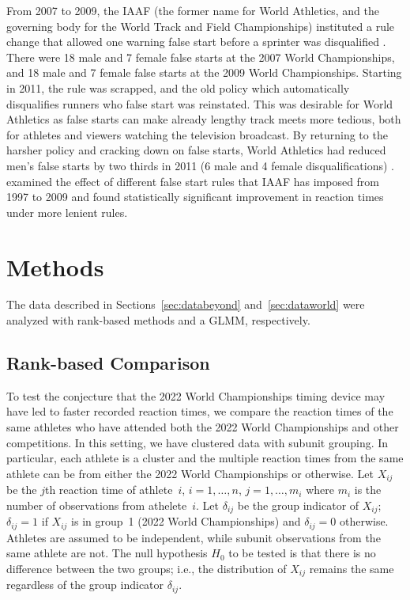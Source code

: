 \documentclass[12pt, letterpaper, titlepage]{article}
\begin{document}
From 2007 to 2009, the IAAF (the former name for World Athletics, and the 
governing body for the World Track and Field Championships) instituted a rule 
change that allowed one warning false start before a sprinter was disqualified 
\citep{iaaf2009falsestart}. There were 18 male and 7 female false starts at the 
2007 World Championships, and 18 male and 7 female false starts at the 2009 World 
Championships. Starting in 2011, the rule was scrapped, and the old policy which
automatically disqualifies runners who false start was reinstated. This was 
desirable for World Athletics as false starts can make already lengthy track 
meets more tedious, both for athletes and viewers watching the television 
broadcast. By returning to the harsher policy and cracking down on false starts,
World Athletics had reduced men's false starts by two thirds in 2011 (6 male and
4 female disqualifications) \citep{iaaf2009falsestart}. \citet{haugen2013effect}
examined the effect of different false start rules that IAAF has imposed from 
1997 to 2009 and found statistically significant improvement in reaction times 
under more lenient rules.



\section{Methods} \label{sec:Methods}

The data described in Sections~\ref{sec:databeyond} and~\ref{sec:dataworld} were
analyzed with rank-based methods and a GLMM, respectively.


\subsection{Rank-based Comparison}\label{sec:rank}


To test the conjecture that the 2022 World Championships timing device may have 
led to faster recorded reaction times, we compare the reaction times of the same
athletes who have attended both the 2022 World Championships and other 
competitions. 
In this setting, we have clustered data with subunit grouping. In particular,
each athlete is a cluster and the multiple reaction times from the same athlete
can be from either the 2022 World Championships or otherwise.
Let $X_{ij}$ be the $j$th reaction time of athlete~$i$, $i = 1, \ldots, n$,
$j = 1, \ldots, m_i$ where $m_i$ is the number of observations from
athelete~$i$. Let $\delta_{ij}$ be the group indicator of $X_{ij}$; $\delta_{ij}
= 1$ if $X_{ij}$ is in group~1 (2022 World Championships) and $\delta_{ij} = 0$ 
otherwise. Athletes are
assumed to be independent, while subunit observations from the same athlete are
not. The null hypothesis $H_0$ to be tested is that there is no difference
between the two groups; i.e., the distribution of $X_{ij}$ remains the same
regardless of the group indicator $\delta_{ij}$.
\end{document}
